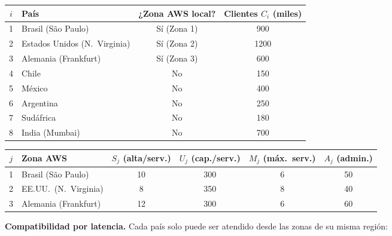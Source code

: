 \documentclass[12pt,a4paper]{article}
\begin{document}
\begin{center}
\renewcommand{\arraystretch}{1.2}
\begin{tabular}{clcc}
\toprule
\textbf{$i$} & \textbf{País} & \textbf{¿Zona AWS local?} &
\textbf{Clientes $C_i$ (miles)} \\
\midrule
1 & Brasil (São Paulo)          & Sí (Zona 1) & 900  \\
2 & Estados Unidos (N.\ Virginia) & Sí (Zona 2) & 1200 \\
3 & Alemania (Frankfurt)        & Sí (Zona 3) & 600  \\
4 & Chile                       & No          & 150  \\
5 & México                      & No          & 400  \\
6 & Argentina                   & No          & 250  \\
7 & Sudáfrica                   & No          & 180  \\
8 & India (Mumbai)              & No          & 700  \\
\bottomrule
\end{tabular}
\end{center}

\begin{center}
\renewcommand{\arraystretch}{1.2}
\begin{tabular}{clcccc}
\toprule
\textbf{$j$} & \textbf{Zona AWS} &
\textbf{$S_j$ (alta/serv.)} &
\textbf{$U_j$ (cap./serv.)} &
\textbf{$M_j$ (máx.\ serv.)} &
\textbf{$A_j$ (admin.)} \\
\midrule
1 & Brasil (São Paulo)     & 10 & 300 & 6 & 50 \\
2 & EE.UU.\ (N.\ Virginia) &  8 & 350 & 8 & 40 \\
3 & Alemania (Frankfurt)   & 12 & 300 & 6 & 60 \\
\bottomrule
\end{tabular}
\end{center}

\textbf{Compatibilidad por latencia.} Cada país solo puede ser atendido desde
las zonas de su misma región:
\end{document}
